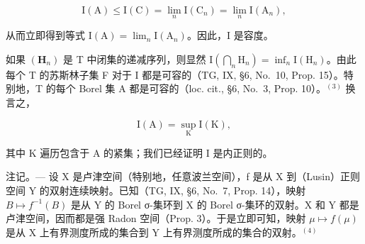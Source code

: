 \[
\mathrm{I} (\mathrm{A}) \leqslant \mathrm{I} (\mathrm{C}) = \lim _ {n} \mathrm{I} (\mathrm{C} _ {n}) = \lim _ {n} \mathrm{I} (\mathrm{A} _ {n}),
\]

从而立即得到等式 \(\mathrm{I}(\mathrm{A})=\lim_{n}\mathrm{I}(\mathrm{A}_{n})\)。因此，I 是容度。

如果 \((\mathbf{H}_{n})\) 是 T 中闭集的递减序列，则显然 \(\mathrm{I}\left(\bigcap_{n}\mathrm{H}_{n}\right)=\inf_{n}\mathrm{I}(\mathrm{H}_{n})\)。由此每个 T 的苏斯林子集 F 对于 I 都是可容的（TG, IX, §6, No.~10, Prop. 15）。特别地，T 的每个 Borel 集 A 都是可容的（loc. cit., §6, No.~3, Prop. 10）。\(^{(3)}\) 换言之，

\[
\mathrm{I} (\mathrm{A}) = \sup _ {\mathrm{K}} \mathrm{I} (\mathrm{K}),
\]

其中 K 遍历包含于 A 的紧集；我们已经证明 I 是内正则的。

注记。--- 设 X 是卢津空间（特别地，任意波兰空间），f 是从 X 到（Lusin）正则空间 Y 的双射连续映射。已知（TG, IX, §6, No.~7, Prop. 14），映射 \(B \mapsto f^{-1}(B)\) 是从 Y 的 Borel σ-集环到 X 的 Borel σ-集环的双射。X 和 Y 都是卢津空间，因而都是强 Radon 空间（Prop. 3）。于是立即可知，映射 \(\mu \mapsto f(\mu)\) 是从 X 上有界测度所成的集合到 Y 上有界测度所成的集合的双射。\(^{(4)}\)

